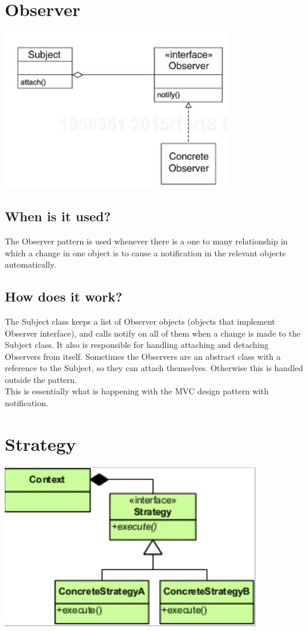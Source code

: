 \documentclass[12pt]{article}
\theoremstyle{definition}
\begin{document}
\section{Observer}
\includegraphics{observer}
\subsection{When is it used?}
The Observer pattern is used whenever there is a one to many relationship in which a change in one object is to cause a notification in the relevant objects automatically.

\subsection{How does it work?}
The Subject class keeps a list of Observer objects (objects that implement Observer interface), and calls notify on all of them when a change is made to the Subject class. It also is responsible for handling attaching and detaching Observers from itself. Sometimes the Observers are an abstract class with a reference to the Subject, so they can attach themselves. Otherwise this is handled outside the pattern. 
\\ \linebreak
This is essentially what is happening with the MVC design pattern with notification. 


\section{Strategy}
\includegraphics{strategy}
\\
\end{document}
